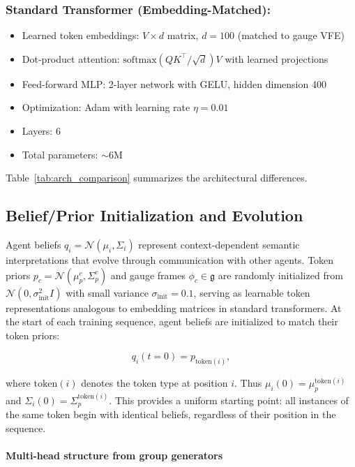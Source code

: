 \documentclass[twoside,11pt]{article}
\begin{document}
\subsubsection{Standard Transformer (Embedding-Matched):}
\begin{itemize}
  \item Learned token embeddings: $V \times d$ matrix, $d=100$ (matched to gauge VFE)
  \item Dot-product attention: $\text{softmax}(QK^\top/\sqrt{d})V$ with learned projections
  \item Feed-forward MLP: 2-layer network with GELU, hidden dimension 400
  \item Optimization: Adam with learning rate $\eta = 0.01$
  \item Layers: 6
  \item Total parameters: $\sim$6M
\end{itemize}

Table~\ref{tab:arch_comparison} summarizes the architectural differences.

\subsection{Belief/Prior Initialization and Evolution}

Agent beliefs $q_i = \mathcal{N}(\mu_i, \Sigma_i)$ represent context-dependent semantic interpretations that evolve through communication with other agents. Token priors $p_c = \mathcal{N}(\mu_p^c, \Sigma_p^c)$ and gauge frames $\phi_c \in \mathfrak{g}$ are randomly initialized from $\mathcal{N}(0, \sigma_{\text{init}}^2 I)$ with small variance $\sigma_{\text{init}} = 0.1$, serving as learnable token representations analogous to embedding matrices in standard transformers. At the start of each training sequence, agent beliefs are initialized to match their token priors:

\begin{equation}
q_i(t=0) = p_{\text{token}(i)},
\label{eq:belief_init}
\end{equation}

where $\text{token}(i)$ denotes the token type at position $i$. Thus $\mu_i(0) = \mu_p^{\text{token}(i)}$ and $\Sigma_i(0) = \Sigma_p^{\text{token}(i)}$. This provides a uniform starting point: all instances of the same token begin with identical beliefs, regardless of their position in the sequence.


\paragraph{Multi-head structure from group generators}
\end{document}
